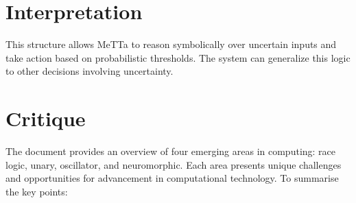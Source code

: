 \documentclass{article}
\begin{document}
\section{Interpretation}
This structure allows MeTTa to reason symbolically over uncertain inputs and take action based on probabilistic thresholds. The system can generalize this logic to other decisions involving uncertainty.

\section{Critique}

The document provides an overview of four emerging areas in computing: race logic, unary, oscillator, and neuromorphic. Each area presents unique challenges and opportunities for advancement in computational technology. To summarise the key points:
\end{document}
